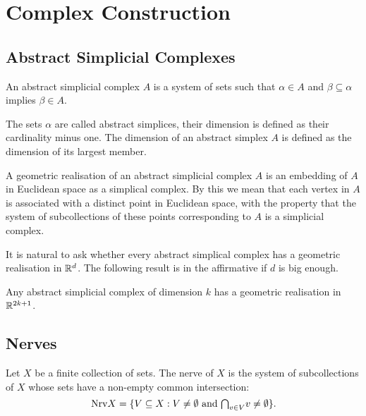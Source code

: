 \section{Complex Construction}




\subsection{Abstract Simplicial Complexes}


\begin{definition}
An abstract simplicial complex $A$ is a system of sets such that $\alpha \in A$ and $\beta \subseteq \alpha$ implies $\beta \in A$.
\end{definition}


The sets $\alpha$ are called abstract simplices, their dimension is defined as their cardinality minus one. The dimension of an abstract simplex $A$ is defined as the dimension of its largest member.


\begin{definition}
A geometric realisation of an abstract simplicial complex $A$ is an embedding of $A$ in Euclidean space as a simplical complex. By this we mean that each vertex in $A$ is associated with a distinct point in Euclidean space, with the property that the system of subcollections of these points corresponding to $A$ is a simplicial complex.
\end{definition}


It is natural to ask whether every abstract simplical complex has a geometric realisation in $\mathbb{R}^d$. The following result is in the affirmative if $d$ is big enough.


\begin{theorem}
Any abstract simplicial complex of dimension $k$ has a geometric realisation in $\mathbb{R}^{2k+1}$.
\end{theorem}




\subsection{Nerves}


\begin{definition}
Let $X$ be a finite collection of sets. The nerve of $X$ is the system of subcollections of $X$ whose sets have a non-empty common intersection:
$$
\nrv X = \{V \subseteq X : V \not= \emptyset \text{ and } \mathsmaller{\bigcap}_{v \in V} v \not= \emptyset\}.
$$
\end{definition}


